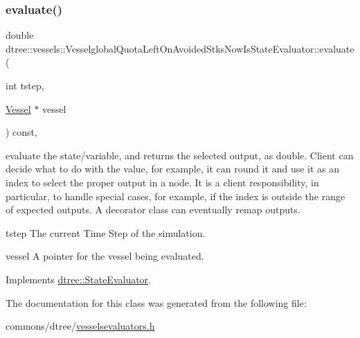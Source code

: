 \subsubsection{\texorpdfstring{evaluate()}{evaluate()}}
{\footnotesize\ttfamily double dtree\+::vessels\+::\+Vesselglobal\+Quota\+Left\+On\+Avoided\+Stks\+Now\+Is\+State\+Evaluator\+::evaluate (\begin{DoxyParamCaption}\item[{int}]{tstep,  }\item[{\mbox{\hyperlink{class_vessel}{Vessel}} $\ast$}]{vessel }\end{DoxyParamCaption}) const\hspace{0.3cm}{\ttfamily [inline]}, {\ttfamily [virtual]}}



evaluate the state/variable, and returns the selected output, as double. Client can decide what to do with the value, for example, it can round it and use it as an index to select the proper output in a node. It is a client responsibility, in particular, to handle special cases, for example, if the index is outside the range of expected outputs. A decorator class can eventually remap outputs. 

\begin{DoxyItemize}
\item tstep The current Time Step of the simulation. \item vessel A pointer for the vessel being evaluated. \end{DoxyItemize}


Implements \mbox{\hyperlink{classdtree_1_1_state_evaluator_ab57666219fbdc728f40d9d5acd5726cb}{dtree\+::\+State\+Evaluator}}.



The documentation for this class was generated from the following file\+:\begin{DoxyCompactItemize}
\item 
commons/dtree/\mbox{\hyperlink{vesselsevaluators_8h}{vesselsevaluators.\+h}}\end{DoxyCompactItemize}
